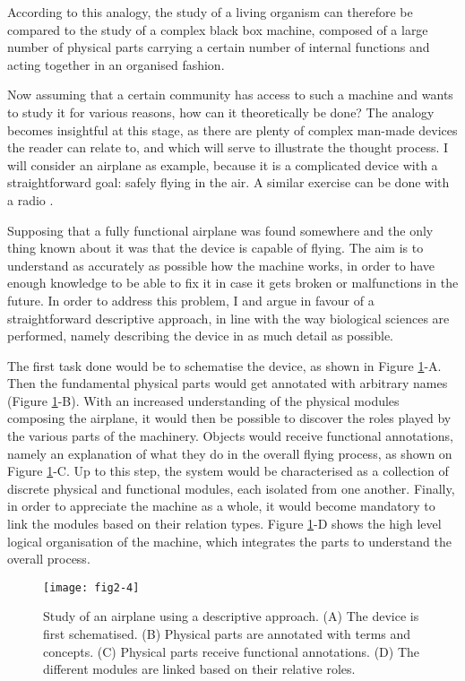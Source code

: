According to this analogy, the study of a living organism can therefore be compared to the study of a complex black box machine, composed of a large number of physical parts carrying a certain number of internal functions and acting together in an organised fashion.

Now assuming that a certain community has access to such a machine and wants to study it for various reasons, how can it theoretically be done? The analogy becomes insightful at this stage, as there are plenty of complex man-made devices the reader can relate to, and which will serve to illustrate the thought process. I will consider an airplane as example, because it is a complicated device with a straightforward goal: safely flying in the air. A similar exercise can be done with a radio \citep{lazebnik2002can}.

Supposing that a fully functional airplane was found somewhere and the only thing known about it was that the device is capable of flying. The aim is to understand as accurately as possible how the machine works, in order to have enough knowledge to be able to fix it in case it gets broken or malfunctions in the future. In order to address this problem, I and \cite{lazebnik2002can} argue in favour of a straightforward descriptive approach, in line with the way biological sciences are performed, namely describing the device in as much detail as possible.

The first task done would be to schematise the device, as shown in Figure \ref{fig2-4}-A. Then the fundamental physical parts would get annotated with arbitrary names (Figure \ref{fig2-4}-B). With an increased understanding of the physical modules composing the airplane, it would then be possible to discover the roles played by the various parts of the machinery. Objects would receive functional annotations, namely an explanation of what they do in the overall flying process, as shown on Figure \ref{fig2-4}-C. Up to this step, the system would be characterised as a collection of discrete physical and functional modules, each isolated from one another. Finally, in order to appreciate the machine as a whole, it would become mandatory to link the modules based on their relation types. Figure \ref{fig2-4}-D shows the high level logical organisation of the machine, which integrates the parts to understand the overall process.

\begin{figure}[H]
    \centering
    \texttt{[image: fig2-4]}
    \caption{Study of an airplane using a descriptive approach. (A) The device is first schematised. (B) Physical parts are annotated with terms and concepts. (C) Physical parts receive functional annotations. (D) The different modules are linked based on their relative roles.}
    \label{fig2-4}
\end{figure}

